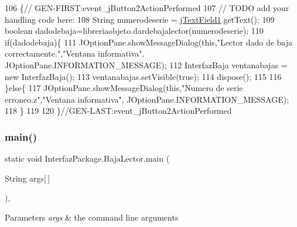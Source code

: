 \begin{DoxyCode}
106                                                                          \{\textcolor{comment}{//
      GEN-FIRST:event\_jButton2ActionPerformed}
107         \textcolor{comment}{// TODO add your handling code here:}
108         String numerodeserie = \mbox{\hyperlink{class_interfaz_package_1_1_baja_lector_a7a476ef16a2314a268fb7e53e32cdd31}{jTextField1}}.getText();
109         \textcolor{keywordtype}{boolean} dadodebaja=libreriaobjeto.dardebajalector(numerodeserie);
110         \textcolor{keywordflow}{if}(dadodebaja)\{
111         JOptionPane.showMessageDialog(\textcolor{keyword}{this},\textcolor{stringliteral}{"Lector dado de baja correctamente."},\textcolor{stringliteral}{"Ventana informativa"},
      JOptionPane.INFORMATION\_MESSAGE);
112         InterfazBaja ventanabajas = \textcolor{keyword}{new} InterfazBaja();
113         ventanabajas.setVisible(\textcolor{keyword}{true});
114         dispose();
115             
116         \}\textcolor{keywordflow}{else}\{
117             JOptionPane.showMessageDialog(\textcolor{keyword}{this},\textcolor{stringliteral}{"Numero de serie erroneo.z"},\textcolor{stringliteral}{"Ventana informativa"},
      JOptionPane.INFORMATION\_MESSAGE);
118         \}
119         
120     \}\textcolor{comment}{//GEN-LAST:event\_jButton2ActionPerformed}
\end{DoxyCode}
\mbox{\label{class_interfaz_package_1_1_baja_lector_ae8d95711504ca7f87351202627520f94}} 
\subsubsection{\texorpdfstring{main()}{main()}}
{\footnotesize\ttfamily static void Interfaz\+Package.\+Baja\+Lector.\+main (\begin{DoxyParamCaption}\item[{String}]{args\mbox{[}$\,$\mbox{]} }\end{DoxyParamCaption})\hspace{0.3cm}{\ttfamily [inline]}, {\ttfamily [static]}}


\begin{DoxyParams}{Parameters}
{\em args} & the command line arguments \\
\hline
\end{DoxyParams}


